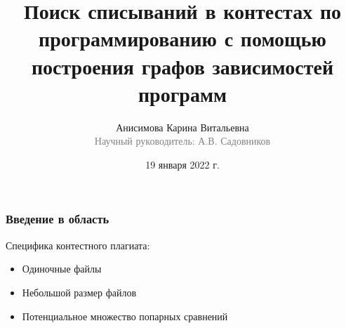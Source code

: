 \documentclass[10pt]{beamer}
\renewcommand{\footnotesize}{\scriptsize}
\begin{document}
\title[Поиск списываний в контестах]{Поиск списываний в контестах по программированию с помощью построения графов зависимостей программ}

\author[Анисимова К.В.]{Анисимова Карина Витальевна\\{\footnotesize\textcolor{gray}{Научный руководитель: А.В. Садовников}}}
\date{19 января 2022 г.}
\frame{\titlepage}

\begin{frame}[fragile]\frametitle{Введение в область}
	Специфика контестного плагиата:
	\begin{itemize}
		\item Одиночные файлы
		\item Небольшой размер файлов
		\item Потенциальное множество попарных сравнений
	\end{itemize}
\end{frame}
\end{document}
